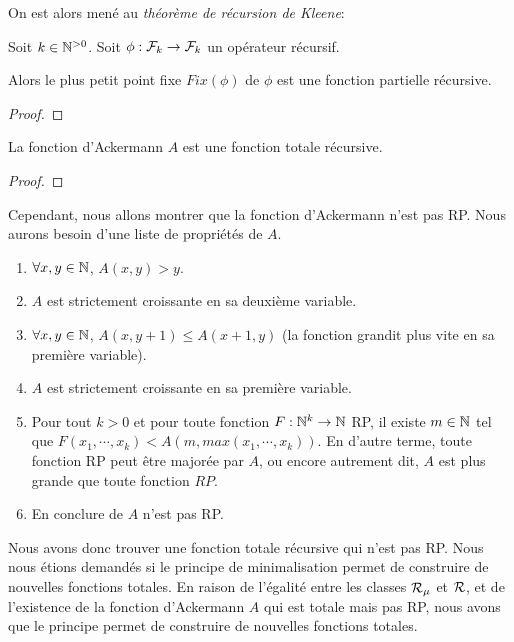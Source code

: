 On est alors mené au \textit{théorème de récursion de Kleene}:

\begin{theorem} 
	\label{theorem:kleene_recursion}
	Soit $k \in \mathbb{N}^{> 0}$.
	Soit $\phi : \mathcal{F}_{k} \rightarrow \mathcal{F}_{k}$ un opérateur
	récursif.

	Alors le plus petit point fixe $Fix(\phi)$ de $\phi$ est une fonction partielle récursive.
\end{theorem}

\ifdefined\outputproof
\begin{proof}

\end{proof}
\fi

\begin{corollary}
	\label{corollary:ackermann_total_recursive}
	La fonction d'Ackermann $A$ est une fonction totale récursive.
\end{corollary}

\ifdefined\outputproof
\begin{proof}

\end{proof}
\fi

Cependant, nous allons montrer que la fonction d'Ackermann n'est pas RP. Nous
aurons besoin d'une liste de propriétés de $A$.

\begin{proposition}
	\begin{enumerate}
		\item $\forall x, y \in \mathbb{N}$, $A(x, y) > y$.
		\item $A$ est strictement croissante en sa deuxième variable.
		\item $\forall x, y \in \mathbb{N}$, $A(x, y + 1) \leq A(x + 1, y)$ (la
			fonction grandit plus vite en sa première variable).
		\item $A$ est strictement croissante en sa première variable.
		\item Pour tout $k > 0$ et pour toute fonction
			$F : \mathbb{N}^{k} \rightarrow \mathbb{N}$ RP, il existe $m \in \mathbb{N}$
			tel que $F(x_{1}, \cdots, x_{k}) < A(m, max(x_{1}, \cdots, x_{k}))$.
			En d'autre terme, toute fonction RP peut être majorée par $A$, ou
			encore autrement dit, $A$ est plus grande que toute fonction $RP$.
		\item En conclure de $A$ n'est pas RP.
	\end{enumerate}
\end{proposition}

Nous avons donc trouver une fonction totale récursive qui n'est pas RP. Nous
nous étions demandés si le principe de minimalisation permet de construire de
nouvelles fonctions totales. En raison de l'égalité entre les classes
$\mathcal{R}_{\mu}$ et $\mathcal{R}$, et de l'existence de la
fonction d'Ackermann $A$ qui est totale mais pas RP, nous avons que le principe
permet de construire de nouvelles fonctions totales.

